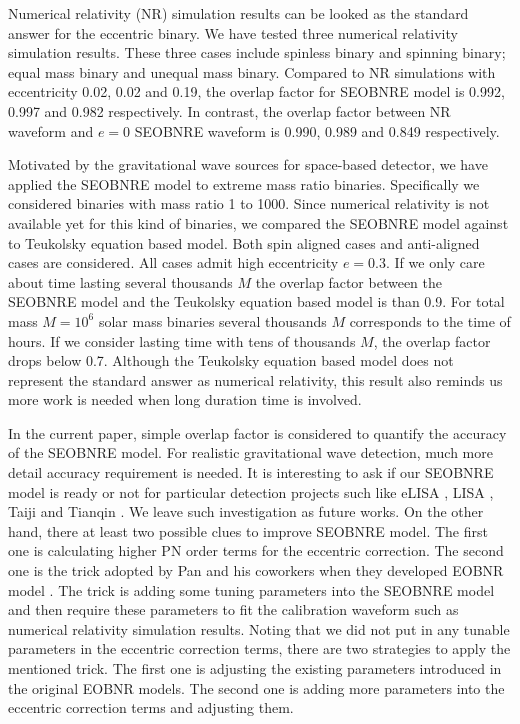 \documentclass[prd,aps,a4paper,superscriptaddress,twocolumn,footinbib,showpacs]{revtex4}
\begin{document}
Numerical relativity (NR) simulation results can be looked as the standard answer for the eccentric binary. We have tested three numerical relativity simulation results. These three cases include spinless binary and spinning binary; equal mass binary and unequal mass binary. Compared to NR simulations with eccentricity 0.02, 0.02 and 0.19, the overlap factor for SEOBNRE model is 0.992, 0.997 and 0.982 respectively. In contrast, the overlap factor between NR waveform and $e=0$ SEOBNRE waveform is 0.990, 0.989 and 0.849 respectively.

Motivated by the gravitational wave sources for space-based detector, we have applied the SEOBNRE model to extreme mass ratio binaries. Specifically we considered binaries with mass ratio 1 to 1000. Since numerical relativity is not available yet for this kind of binaries, we compared the SEOBNRE model against to Teukolsky equation based model. Both spin aligned cases and anti-aligned cases are considered. All cases admit high eccentricity $e=0.3$. If we only care about time lasting several thousands $M$ the overlap factor between the SEOBNRE model and the Teukolsky equation based model is than 0.9. For total mass $M=10^6$ solar mass binaries several thousands $M$ corresponds to the time of hours. If we consider lasting time with tens of thousands $M$, the overlap factor drops below 0.7. Although the Teukolsky equation based model does not represent the standard answer as numerical relativity, this result also reminds us more work is needed when long duration time is involved.

In the current paper, simple overlap factor is considered to quantify the accuracy of the SEOBNRE model. For realistic gravitational wave detection, much more detail accuracy requirement \cite{PhysRevD.78.124020,PhysRevD.80.042005,PhysRevD.80.064019,PhysRevD.82.084020,PhysRevD.94.124030} is needed. It is interesting to ask if our SEOBNRE model is ready or not for particular detection projects such like eLISA \cite{amaro2012low}, LISA \cite{audley2017laser}, Taiji \cite{gong2011scientific} and Tianqin \cite{luo2016tianqin}. We leave such investigation as future works. On the other hand, there at least two possible clues to improve SEOBNRE model. The first one is calculating higher PN order terms for the eccentric correction. The second one is the trick adopted by Pan and his coworkers when they developed EOBNR model \cite{PhysRevD.76.104049}. The trick is adding some tuning parameters into the SEOBNRE model and then require these parameters to fit the calibration waveform such as numerical relativity simulation results. Noting that we did not put in any tunable parameters in the eccentric correction terms, there are two strategies to apply the mentioned trick. The first one is adjusting the existing parameters introduced in the original EOBNR models. The second one is adding more parameters into the eccentric correction terms and adjusting them.
\end{document}
